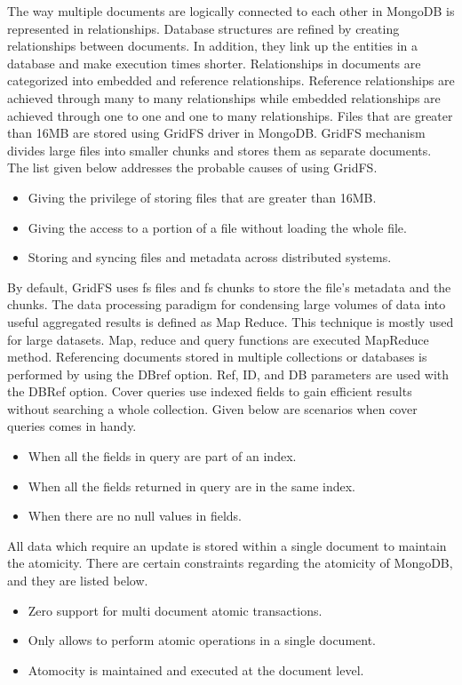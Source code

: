\documentclass[a4Paper,12pt]{report}
\begin{document}
The way multiple documents are logically connected to each other in MongoDB is represented in relationships. Database structures are refined by creating relationships between documents. In addition, they link up the entities in a database and make execution times shorter. Relationships in documents are categorized into embedded and reference relationships. Reference relationships are achieved through many to many relationships while embedded relationships are achieved through one to one and one to many relationships. Files that are greater than 16MB are stored using GridFS driver in MongoDB. GridFS mechanism divides large files into smaller chunks and stores them as separate documents. The list given below addresses the probable causes of using GridFS. 
\begin{itemize}
\item Giving the privilege of storing files that are greater than 16MB.
\item Giving the access to a portion of a file without loading the whole file.
\item Storing and syncing files and metadata across distributed systems.
\end{itemize}
By default, GridFS uses fs files and fs chunks to store the file’s metadata and the chunks. The data processing paradigm for condensing large volumes of data into useful aggregated results is defined as Map Reduce. This technique is mostly used for large datasets. Map, reduce and query functions are executed MapReduce method. Referencing documents stored in multiple collections or databases is performed by using the DBref option. Ref, ID, and DB parameters are used with the DBRef option. Cover queries use indexed fields to gain efficient results without searching a whole collection. Given below are scenarios when cover queries comes in handy.
\begin{itemize}
\item When all the fields in query are part of an index.
\item When all the fields returned in query are in the same index.
\item When there are no null values in fields.
\end{itemize}
All data which require an update is stored within a single document to maintain the atomicity. There are certain constraints regarding the atomicity of MongoDB, and they are listed below. 
\begin{itemize}
\item Zero support for multi document atomic transactions.
\item Only allows to perform atomic operations in a single document.
\item Atomocity is maintained and executed at the document level.
\end{itemize}
\end{document}
